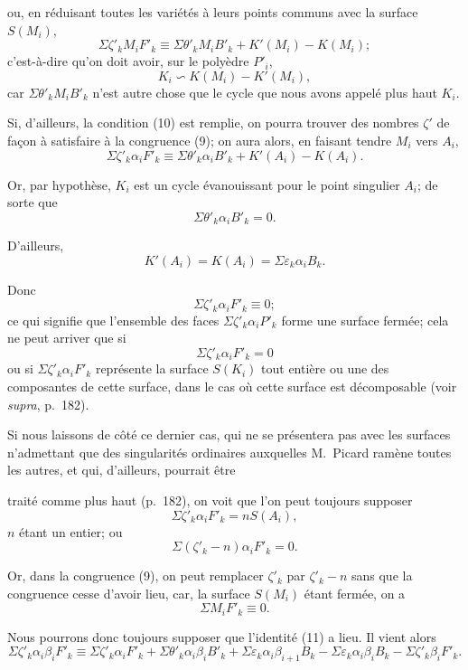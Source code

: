\documentclass{article}
\begin{document}
ou, en réduisant toutes les variétés à leurs points communs avec la surface $S(M_{i})$,
\[ \Sigma \zeta'_{k} M_{i}F'_{k} \equiv \Sigma \theta'_{k} M_{i}B'_{k} + K'(M_{i}) - K(M_{i}); \tag{9} \]
c'est-à-dire qu'on doit avoir, sur le polyèdre $P'_{i}$,
\[ K_{i} \backsim K(M_{i}) - K'(M_{i}), \tag{10} \]
car $\Sigma \theta'_{k} M_{i}B'_{k}$ n'est autre chose que le cycle que nous avons appelé plus haut $K_{i}$.

Si, d'ailleurs, la condition (10) est remplie, on pourra trouver des nombres $\zeta'$ de façon à satisfaire à la congruence (9); on aura alors, en faisant tendre $M_{i}$ vers $A_{i}$,
\[ \Sigma \zeta'_{k} \alpha_{i}F'_{k} \equiv \Sigma \theta'_{k} \alpha_{i}B'_{k} + K'(A_{i}) - K(A_{i}). \]

Or, par hypothèse, $K_{i}$ est un cycle évanouissant pour le point singulier $A_{i}$; de sorte que
\[ \Sigma \theta'_{k} \alpha_{i}B'_{k} = 0. \]

D'ailleurs,
\[ K'(A_{i}) = K(A_{i}) = \Sigma \varepsilon_{k} \alpha_{i}B_{k}. \]

Donc
\[ \Sigma \zeta'_{k} \alpha_{i}F'_{k} \equiv 0; \]
ce qui signifie que l'ensemble des faces $\Sigma \zeta'_{k} \alpha_{i}P'_{k}$ forme une surface fermée; cela ne peut arriver que si
\[ \Sigma \zeta'_{k} \alpha_{i}F'_{k} = 0 \tag{11} \]
ou si $\Sigma \zeta'_{k} \alpha_{i}F'_{k}$ représente la surface $S(K_{i})$ tout entière ou une des composantes de cette surface, dans le cas où cette surface est décomposable (voir \emph{supra}, p.\ 182).

Si nous laissons de côté ce dernier cas, qui ne se présentera pas avec les surfaces n'admettant que des singularités ordinaires auxquelles M.~Picard ramène toutes les autres, et qui, d'ailleurs, pourrait être

traité comme plus haut (p.\ 182), on voit que l'on peut toujours supposer
\[ \Sigma \zeta'_{k} \alpha_{i}F'_{k} = nS(A_{i}), \]
$n$ étant un entier; ou
\[ \Sigma(\zeta'_{k} - n)\alpha_{i}F'_{k} = 0. \]

Or, dans la congruence (9), on peut remplacer $\zeta'_{k}$ par $\zeta'_{k} - n$ sans que la congruence cesse d'avoir lieu, car, la surface $S(M_{i})$ étant fermée, on a
\[ \Sigma M_{i}F'_{k} \equiv 0. \]

Nous pourrons donc toujours supposer que l'identité (11) a lieu. Il vient alors
\[ \Sigma \zeta'_{k} \alpha_{i}\beta_{i}F'_{k} \equiv \Sigma \zeta'_{k} \alpha_{i}F'_{k} + \Sigma \theta'_{k} \alpha_{i}\beta_{i}B'_{k} + \Sigma \varepsilon_{k} \alpha_{i}\beta_{i+1}B_{k} - \Sigma \varepsilon_{k} \alpha_{i}\beta_{i}B_{k} - \Sigma \zeta'_{k} \beta_{i}F'_{k}. \]
\end{document}
